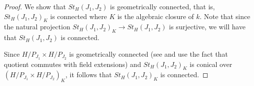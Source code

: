 \documentclass{amsart}
\theoremstyle{plain}
\theoremstyle{definition}
\theoremstyle{remark}
\begin{document}
\begin{proof}
We show that $St_{H}(J_{1},J_{2})$ is geometrically connected, that is, $St_{H}(J_{1},J_{2})_{K}$ is connected where $K$ is the algebraic closure of $k$. Note that since the natural projection $St_{H}(J_{1},J_{2})_{K}\rightarrow St_{H}(J_{1},J_{2})$ is surjective,
we will have that $St_{H}(J_{1},J_{2})$ is connected.

Since $H/P_{J_{1}}\times H/P_{J_{2}}$ is geometrically connected (see \cite[Proposition 5.2.4]{Poo} and use the fact that quotient commutes with field extensions) and $St_{H}(J_{1},J_{2})_{K}$ is conical over
$(H/P_{J_{1}}\times H/P_{J_{2}})_{K}$, it follows that $St_{H}(J_{1},J_{2})_{K}$ is connected.


\end{proof}
\end{document}
